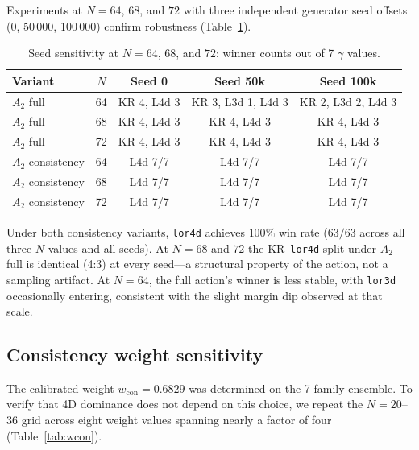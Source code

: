\documentclass[12pt,a4paper]{article}
\begin{document}
Experiments at $N = 64$, $68$, and $72$ with three independent generator seed
offsets (0, 50\,000, 100\,000) confirm robustness (Table~\ref{tab:seed}).

\begin{table}[h]
\centering
\caption{Seed sensitivity at $N = 64$, $68$, and $72$: winner counts out of 7
$\gamma$ values.}
\label{tab:seed}
\begin{tabular}{lcccc}
\toprule
\textbf{Variant} & $N$ & \textbf{Seed 0} & \textbf{Seed 50k} &
\textbf{Seed 100k} \\
\midrule
$A_2$ full & 64 & KR 4, L4d 3 & KR 3, L3d 1, L4d 3 & KR 2, L3d 2, L4d 3 \\
$A_2$ full & 68 & KR 4, L4d 3 & KR 4, L4d 3 & KR 4, L4d 3 \\
$A_2$ full & 72 & KR 4, L4d 3 & KR 4, L4d 3 & KR 4, L4d 3 \\
$A_2$ consistency & 64 & L4d 7/7 & L4d 7/7 & L4d 7/7 \\
$A_2$ consistency & 68 & L4d 7/7 & L4d 7/7 & L4d 7/7 \\
$A_2$ consistency & 72 & L4d 7/7 & L4d 7/7 & L4d 7/7 \\
\bottomrule
\end{tabular}
\end{table}

Under both consistency variants, \texttt{lor4d} achieves $100\%$ win rate
($63/63$ across all three $N$ values and all seeds). At $N = 68$ and $72$ the
KR--\texttt{lor4d} split under $A_2$ full is identical (4:3) at every
seed---a structural property of the action, not a sampling artifact. At
$N = 64$, the full action's winner is less stable, with \texttt{lor3d}
occasionally entering, consistent with the slight margin dip observed at that
scale.

\subsection{Consistency weight sensitivity}
\label{sec:wcon}

The calibrated weight $w_{\text{con}} = 0.6829$ was determined on the 7-family
ensemble. To verify that 4D dominance does not depend on this choice, we repeat
the $N = 20$--$36$ grid across eight weight values spanning nearly a factor of
four (Table~\ref{tab:wcon}).
\end{document}
